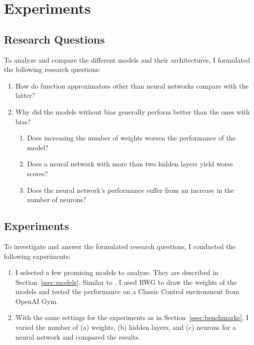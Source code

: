 
\chapter{Experiments}
\label{ch:experiments}

\section{Research Questions}
To analyze and compare the different models and their architectures, I formulated the following research questions:
\begin{enumerate}
  \item How do function approximators other than neural networks compare with the latter?
  \item Why did the models without bias generally perform better than the ones with bias?
  \begin{enumerate}
    \item Does increasing the number of weights worsen the performance of the model?
    \item Does a neural network with more than two hidden layers yield worse scores?
    \item Does the neural network's performance suffer from an increase in the number of neurons?
  \end{enumerate}
\end{enumerate}

\section{Experiments}
To investigate and answer the formulated research questions, I conducted the following experiments:
\begin{enumerate}
  \item I selected a few promising models to analyze. They are described in Section~\ref{ssec:models}. Similar to \citet{oller_analyzing_2020}, I used RWG to draw the weights of the models and tested the performance on a Classic Control environment from OpenAI Gym.
  \item With the same settings for the experiments as in Section~\ref{ssec:benchmarks}, I varied the number of (a) weights, (b) hidden layers, and (c) neurons for a neural network and compared the results.
\end{enumerate}

